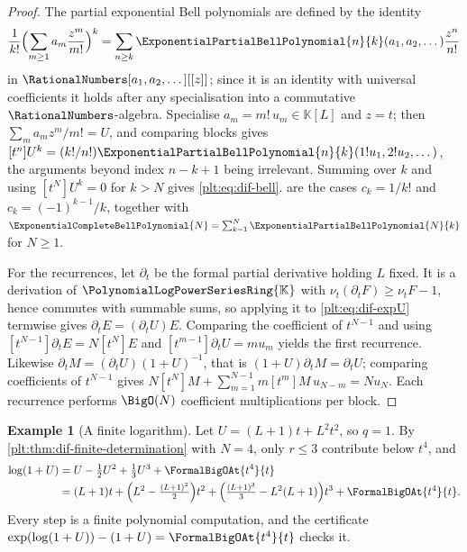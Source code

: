 \documentclass[11pt,oneside]{article}
\theoremstyle{plain}
\theoremstyle{definition}
\newtheorem{example}[theorem]{Example}
\theoremstyle{remark}
\newcommand{\K}{\mathbb{K}}
\newcommand{\PLpow}{\PolynomialLogPowerSeriesRing{\K}}   %
\newcommand{\ordt}{\nu_{t}}                              %
\begin{document}
\begin{proof}
The partial exponential Bell polynomials are defined \cite{comtet-book} by the
identity
\[
  \frac{1}{k!}\Bigl(\sum_{m\ge1}a_{m}\frac{z^{m}}{m!}\Bigr)^{k}
  =\sum_{n\ge k}\ExponentialPartialBellPolynomial{n}{k}(a_{1},a_{2},\dots)
   \frac{z^{n}}{n!}
\]
in \(\RationalNumbers[a_{1},a_{2},\dots][[z]]\); since it is an identity with
universal coefficients it holds after any specialisation into a commutative
\(\RationalNumbers\)-algebra.  Specialise \(a_{m}=m!\,u_{m}\in\K[L]\) and
\(z=t\); then \(\sum_{m}a_{m}z^{m}/m!=U\), and comparing blocks gives
\([t^{n}]U^{k}=(k!/n!)\ExponentialPartialBellPolynomial{n}{k}(1!u_{1},2!u_{2},
\dots)\), the arguments beyond index \(n-k+1\) being irrelevant.  Summing over
\(k\) and using \([t^{N}]U^{k}=0\) for \(k>N\) gives \cref{plt:eq:dif-bell}.
 are the cases
\(c_{k}=1/k!\) and \(c_{k}=(-1)^{k-1}/k\), together with
\(\ExponentialCompleteBellPolynomial{N}=\sum_{k=1}^{N}
\ExponentialPartialBellPolynomial{N}{k}\) for \(N\ge1\).

For the recurrences, let \(\partial_{t}\) be the formal partial derivative
holding \(L\) fixed.  It is a derivation of \(\PLpow\) with
\(\ordt(\partial_{t}F)\ge\ordt F-1\), hence commutes with summable sums, so
applying it to \cref{plt:eq:dif-expU} termwise gives
\(\partial_{t}E=(\partial_{t}U)E\).  Comparing the coefficient of \(t^{N-1}\)
and using \([t^{N-1}]\partial_{t}E=N[t^{N}]E\) and
\([t^{m-1}]\partial_{t}U=mu_{m}\) yields the first recurrence.  Likewise
\(\partial_{t}M=(\partial_{t}U)(1+U)^{-1}\), that is
\((1+U)\partial_{t}M=\partial_{t}U\); comparing coefficients of \(t^{N-1}\)
gives \(N[t^{N}]M+\sum_{m=1}^{N-1}m[t^{m}]M\,u_{N-m}=Nu_{N}\).  Each recurrence
performs \(\BigO(N)\) coefficient multiplications per block.
\end{proof}

\begin{example}[A finite logarithm]\label{plt:ex:dif-log-finite}
Let \(U=(L+1)t+L^{2}t^{2}\), so \(q=1\).  By
\cref{plt:thm:dif-finite-determination} with \(N=4\), only \(r\le3\)
contribute below \(t^{4}\), and
\begin{align*}
  \log(1+U)
  &=U-\tfrac12U^{2}+\tfrac13U^{3}+\FormalBigOAt{t^{4}}{t}\\
  &=(L+1)t
   +\Bigl(L^{2}-\tfrac{(L+1)^{2}}{2}\Bigr)t^{2}
   +\Bigl(\tfrac{(L+1)^{3}}{3}-L^{2}(L+1)\Bigr)t^{3}
   +\FormalBigOAt{t^{4}}{t}.
\end{align*}
Every step is a finite polynomial computation, and the certificate
\(\exp(\log(1+U))-(1+U)=\FormalBigOAt{t^{4}}{t}\) checks it.
\end{example}
\end{document}
